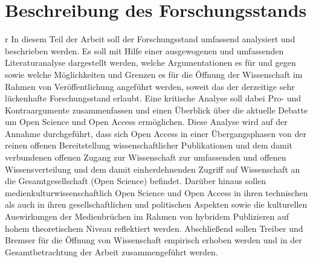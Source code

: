 \section{Beschreibung des Forschungsstands}r
In diesem Teil der Arbeit soll der Forschungsstand umfassend analysiert und beschrieben werden. Es soll mit Hilfe einer ausgewogenen und umfassenden Literaturanalyse dargestellt werden, welche Argumentationen es für und gegen sowie welche Möglichkeiten und Grenzen es für die Öffnung der Wissenschaft im Rahmen von Veröffentlichung angeführt werden, soweit das der derzeitige sehr lückenhafte Forschungsstand erlaubt. Eine kritische Analyse soll dabei Pro- und Kontraargumente zusammenfassen und einen Überblick über die aktuelle Debatte um Open Science und Open Access ermöglichen. Diese Analyse wird auf der Annahme durchgeführt, dass sich Open Access in einer Übergangsphasen von der reinen offenen Bereitstellung wissenschaftlicher Publikationen und dem damit verbundenen offenen Zugang zur Wissenschaft zur umfassenden und offenen Wissensverteilung und dem damit einherdehnenden Zugriff auf Wissenschaft an die Gesamtgesellschaft (Open Science) befindet. Darüber hinaus sollen medienkulturwissenschaftlich Open Science und Open Access in ihren technischen als auch in ihren gesellschaftlichen und politischen Aspekten sowie die kulturellen Auswirkungen der Medienbrüchen im Rahmen von hybridem Publizieren auf hohem theoretischem Niveau reflektiert werden. Abschließend sollen Treiber und Bremser für die Öffnung von Wissenschaft empirisch erhoben werden und in der Gesamtbetrachtung der Arbeit zusammengeführt werden.

